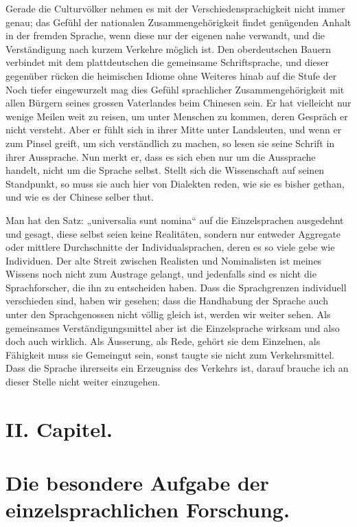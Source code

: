 Gerade die Culturvölker nehmen es mit der Verschiedensprachigkeit nicht immer genau; das Gefühl der nationalen Zusammengehörigkeit findet genügenden Anhalt in der fremden Sprache, wenn diese nur der eigenen nahe verwandt, und die Verständigung nach kurzem Verkehre möglich ist. Den oberdeutschen Bauern verbindet mit dem plattdeutschen die gemeinsame Schriftsprache, und dieser gegenüber rücken die heimischen Idiome ohne Weiteres hinab auf die Stufe der  Noch tiefer \label{fp.59} eingewurzelt mag dies Gefühl sprachlicher Zusammengehörigkeit mit allen Bürgern seines grossen Vaterlandes beim Chinesen sein. Er hat vielleicht nur wenige Meilen weit zu reisen, um unter Menschen zu kommen, deren Gespräch er nicht versteht. Aber er fühlt sich in ihrer Mitte unter Landsleuten, und wenn er zum Pinsel greift, um sich verständlich zu machen, so lesen sie seine Schrift in ihrer Aussprache. Nun merkt er, dass es sich eben nur um die Aussprache handelt, nicht um die Sprache selbst. Stellt sich die Wissenschaft auf seinen Standpunkt, so muss sie auch hier von Dialekten reden, wie sie es bisher gethan, und wie es der Chinese selber thut.

Man hat den Satz: „universalia sunt nomina“ auf die Einzelsprachen ausgedehnt und gesagt, diese selbst seien keine Realitäten, sondern nur entweder Aggregate oder mittlere Durchschnitte der Individualsprachen, deren es so viele gebe wie Individuen. Der alte Streit zwischen Realisten und Nominalisten ist meines Wissens noch nicht zum Austrage gelangt, und jedenfalls sind es nicht die Sprachforscher, die ihn zu entscheiden haben. Dass die Sprachgrenzen individuell verschieden sind, haben wir gesehen; dass die Handhabung der Sprache auch unter den Sprachgenossen nicht völlig gleich ist, werden wir weiter sehen. Als gemeinsames Verständigungsmittel aber ist die Einzelsprache wirksam und also doch auch wirklich. Als Äusserung, als Rede, gehört sie dem Einzelnen, als Fähigkeit muss sie Gemeingut sein, sonst taugte sie nicht zum Verkehrsmittel. Dass die Sprache ihrerseits ein Erzeugniss des Verkehrs ist, darauf brauche ich an dieser Stelle nicht weiter einzugehen.

\section*{II. Capitel.}
\section*{Die besondere Aufgabe der einzelsprachlichen Forschung.}\label{II.II}


